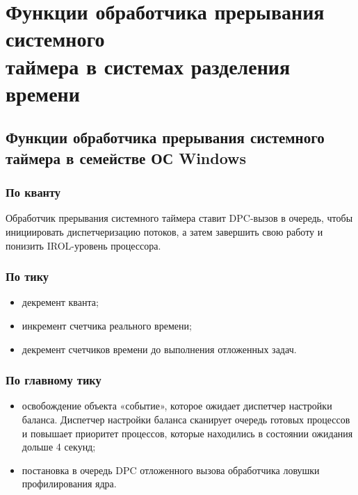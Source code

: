 \chapter{Функции обработчика прерывания системного \\ таймера в системах разделения времени}

\section{Функции обработчика прерывания системного \\ таймера в семействе ОС Windows}

\subsection*{По кванту}

Обработчик прерывания системного таймера ставит DPC-вызов в очередь, чтобы инициировать диспетчеризацию потоков, а затем завершить свою работу и понизить IROL-уровень процессора. 

\subsection*{По тику}

\begin{itemize}[label*=--]
	\item декремент кванта;
	\item  инкремент счетчика реального времени;
	\item декремент счетчиков времени до выполнения отложенных задач.
\end{itemize}

\subsection*{По главному тику}

\begin{itemize}[label*=--]
	\item освобождение объекта «событие», которое ожидает диспетчер настройки баланса. Диспетчер настройки баланса сканирует очередь готовых процессов и повышает приоритет процессов, которые находились в состоянии ожидания дольше 4 секунд;
	\item постановка в очередь DPC отложенного вызова обработчика ловушки профилирования ядра.
\end{itemize}

\clearpage

